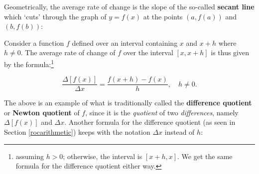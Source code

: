 \documentclass{ximera}
\begin{document}
Geometrically, the average rate of change is the slope of the so-called \textbf{secant line} which `cuts' through the graph of $y = f(x)$ at the points $(a,f(a))$ and $(b, f(b))$:

\begin{image}
\end{image}

Consider a function $f$ defined over an interval containing $x$ and $x+h$ where $h \neq 0$. The average rate of change of $f$ over the interval $[x,x+h]$ is thus given by the formula:\footnote{assuming $h>0$;  otherwise,  the interval is $[x+h, x]$.  We get the same formula for the difference quotient either way.}

\[  \frac{\Delta[f(x)]}{\Delta x} =  \frac{f(x+h)-f(x)}{h}, \quad h \neq 0.\]

The above is an example of what is traditionally called the  \textbf{difference quotient}  or  \textbf{Newton quotient} of $f$, since it is the \textit{quotient} of two \textit{differences}, namely $\Delta[f(x)]$ and $\Delta x$. Another formula for the difference quotient (as seen in Section \ref{rocarithmetic}) keeps with the notation $\Delta x$ instead of $h$:
\end{document}
